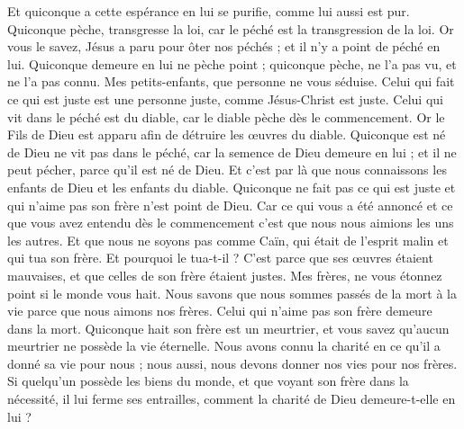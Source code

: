 \begin{multicols}{2}
Et quiconque a cette espérance en lui se purifie, comme lui aussi est pur.
Quiconque pèche, transgresse la loi, car le péché est la transgression de la loi.
Or vous le savez, Jésus a paru pour ôter nos péchés ; et il n'y a point de péché en lui.
Quiconque demeure en lui ne pèche point ; quiconque pèche, ne l'a pas vu, et ne l'a pas connu.
Mes petits-enfants, que personne ne vous séduise. Celui qui fait ce qui est juste est une personne juste, comme Jésus-Christ est juste.
Celui qui vit dans le péché est du diable, car le diable pèche dès le commencement. Or le Fils de Dieu est apparu afin de détruire les œuvres du diable.
Quiconque est né de Dieu ne vit pas dans le péché, car la semence de Dieu demeure en lui ; et il ne peut pécher, parce qu'il est né de Dieu.
Et c'est par là que nous connaissons les enfants de Dieu et les enfants du diable. Quiconque ne fait pas ce qui est juste et qui n'aime pas son frère n'est point de Dieu.
Car ce qui vous a été annoncé et ce que vous avez entendu dès le commencement c’est que nous nous aimions les uns les autres.
Et que nous ne soyons pas comme Caïn{}, qui était de l'esprit malin et qui tua son frère. Et pourquoi le tua-t-il ? C’est parce que ses œuvres étaient mauvaises, et que celles de son frère étaient justes.
Mes frères, ne vous étonnez point si le monde vous hait.
Nous savons que nous sommes passés de la mort à la vie parce que nous aimons nos frères. Celui qui n'aime pas son frère demeure dans la mort.
Quiconque hait son frère est un meurtrier, et vous savez qu'aucun meurtrier ne possède la vie éternelle.
Nous avons connu la charité en ce qu'il a donné sa vie pour nous ; nous aussi, nous devons donner nos vies pour nos frères{}.
Si quelqu’un possède les biens du monde, et que voyant son frère dans la nécessité, il lui ferme ses entrailles, comment la charité de Dieu demeure-t-elle en lui ?

\end{multicols}
